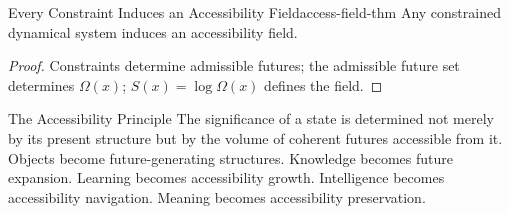 \begin{theorem}{Every Constraint Induces an Accessibility Field}{access-field-thm}
  Any constrained dynamical system induces an accessibility field.
\end{theorem}
\begin{proof}
  Constraints determine admissible futures; the admissible future set
  determines $\Omega(x)$; $S(x) = \log \Omega(x)$ defines the field.
\end{proof}

\begin{namedthm}{The Accessibility Principle}
  The significance of a state is determined not merely by its present
  structure but by the volume of coherent futures accessible from it.
  Objects become future-generating structures. Knowledge becomes future
  expansion. Learning becomes accessibility growth. Intelligence becomes
  accessibility navigation. Meaning becomes accessibility preservation.
\end{namedthm}
